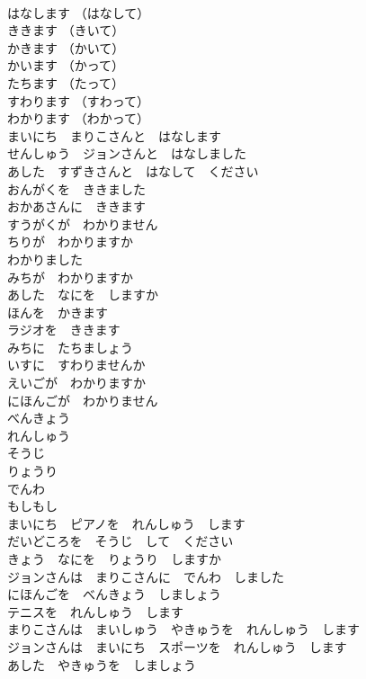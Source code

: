 \documentclass[8pt]{extreport}
\begin{document}
\begin{CJK}{UTF8}{min}
\\	はなします （はなして）	
\\	ききます （きいて）	
\\	かきます （かいて）	
\\	かいます （かって）	
\\	たちます （たって）	
\\	すわります （すわって）	
\\	わかります （わかって）	
\\	まいにち　まりこさんと　はなします	
\\	せんしゅう　ジョンさんと　はなしました	
\\	あした　すずきさんと　はなして　ください	
\\	おんがくを　ききました	
\\	おかあさんに　ききます	
\\	すうがくが　わかりません	
\\	ちりが　わかりますか	
\\	わかりました	
\\	みちが　わかりますか	
\\	あした　なにを　しますか	
\\	ほんを　かきます	
\\	ラジオを　ききます	
\\	みちに　たちましょう	
\\	いすに　すわりませんか	
\\	えいごが　わかりますか	
\\	にほんごが　わかりません	
\\	べんきょう	
\\	れんしゅう	
\\	そうじ	
\\	りょうり	
\\	でんわ	
\\	もしもし	
\\	まいにち　ピアノを　れんしゅう　します	
\\	だいどころを　そうじ　して　ください	
\\	きょう　なにを　りょうり　しますか	
\\	ジョンさんは　まりこさんに　でんわ　しました	
\\	にほんごを　べんきょう　しましょう	
\\	テニスを　れんしゅう　します	
\\	まりこさんは　まいしゅう　やきゅうを　れんしゅう　します	
\\	ジョンさんは　まいにち　スポーツを　れんしゅう　します	
\\	あした　やきゅうを　しましょう	

\end{CJK}
\end{document}
